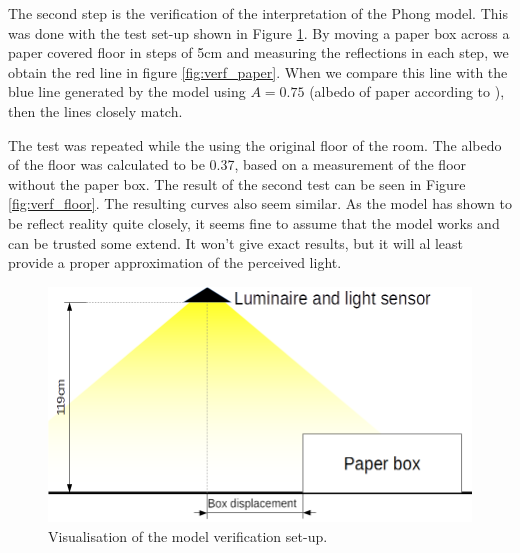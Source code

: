 The second step is the verification of the interpretation of the Phong model. This was done with the test set-up shown in Figure \ref{fig:VerificationSetup}. By moving a paper box across a paper covered floor in steps of 5cm and measuring the reflections in each step, we obtain the red line in figure \ref{fig:verf_paper}. When we compare this line with the blue line generated by the model using $A = 0.75$ (albedo of paper according to \cite{Albedo}), then the lines closely match.

The test was repeated while the using the original floor of the room. The albedo of the floor was calculated to be 0.37, based on a measurement of the floor without the paper box. The result of the second test can be seen in Figure \ref{fig:verf_floor}. The resulting curves also seem similar. As the model has shown to be reflect reality quite closely, it seems fine to assume that the model works and can be trusted some extend. It won't give exact results, but it will al least provide a proper approximation of the perceived light.

\begin{figure}[]
	\centering
	\includegraphics[width=\textwidth]{pics/Verification_Situation.png}
	\caption{Visualisation of the model verification set-up.\label{fig:VerificationSetup}}
\end{figure}

